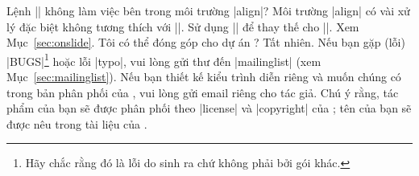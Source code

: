 \begin{itemize}[leftmargin=0pt]
\question
Lệnh |\pause| không làm việc bên trong môi trường |align|?
\answer
Môi trường |align| có vài xử lý đặc biệt không tương thích với |\pause|.
Sử dụng |\onslide| để thay thế cho |\pause|. Xem Mục~\vref{sec:onslide}.
\question
Tôi có thể đóng góp cho dự án ?
\answer
Tất nhiên. Nếu bạn gặp (lỗi) |BUGS|\footnote{Hãy chắc rằng đó là lỗi do
 sinh ra chứ không phải bởi gói khác.} hoặc lỗi |typo|, vui lòng
gửi thư đến |mailinglist| (xem Mục~\vref{sec:mailinglist}). Nếu bạn thiết
kế kiểu trình diễn riêng và muốn chúng có trong bản phân phối của ,
vui lòng gửi email riêng cho tác giả. Chú ý rằng, tác phẩm của bạn sẽ được
phân phối theo |license| và |copyright| của ; tên của bạn
sẽ được nêu trong tài liệu của .
\end{itemize}

